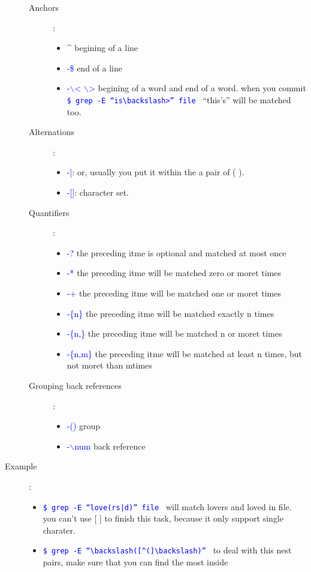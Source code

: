 \documentclass[a4paper,12pt,twoside]{book}
\newcommand{\linuxcommand}[1]{\texttt{\textcolor{blue}{\$ #1 \Pisymbol{psy}{191}}}}
\newcommand{\op}[1]{\textcolor{blue}{-#1}}
\begin{document}
\begin{CJK*}{UTF8}{song}
\begin{description}
\begin{description}
\begin{center}
\begin{tabular}{|c|p{15em}|c|}
			\hline
			\end{tabular}
		\end{center}
	\item[Anchors]:
		\begin{itemize}
		\item \^{} begining of a line
		\item \op{\$} end of a line
		\item \op{$\backslash$< $\backslash$>}  begining of a word and end of a word. when you commit \linuxcommand{grep -E ``is$\backslash$>'' file} ``this's'' will be matched too.
		\end{itemize}
	\item[Alternations]:
		\begin{itemize}
		\item \op{|}: or, usually you put it within the a pair of ( ).
		\item \op{[]}: character set.
		\end{itemize}
	\item[Quantifiers]:
		\begin{itemize}
		\item \op{?} the preceding itme is optional and matched at most once
		\item \op{*} the preceding itme will be matched zero or moret times
		\item \op{+} the preceding itme will be matched one or moret times
		\item \op{\{n\}} the preceding itme will be matched exactly n times
		\item \op{\{n,\}} the preceding itme will be matched n or moret times
		\item \op{\{n,m\}} the preceding itme will be matched at least n times, but not moret than mtimes
		\end{itemize}
	\item[Grouping back references]:
		\begin{itemize}
		\item \op{()} group
		\item \op{$\backslash$num} back reference
		\end{itemize}
	\end{description}
	\item[Example]:
		\begin{itemize}
		\item \linuxcommand{grep -E ``love(rs|d)'' file} will match lovers and loved in file. you can't use [ ] to finish this task, because it only support single charater.
		\item \linuxcommand{grep -E ``$\backslash$([\^{}(]$\backslash$)''} to deal with this nest pairs, make sure that you can find the most inside

\end{itemize}
\end{description}
\end{CJK*}
\end{document}
